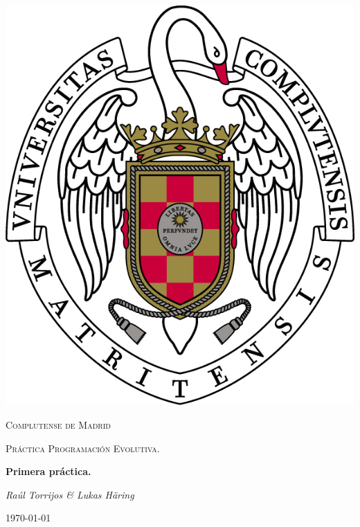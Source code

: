 \documentclass{article}
\begin{document}
\usetikzlibrary{automata,arrows, positioning}
\renewcommand{\contentsname}{Tabla de contenidos}

\begin{titlepage}
	\begin{center}
		\includegraphics{./images/escudo.jpg}
	\end{center}
	\centering
	{\scshape\LARGE Complutense de Madrid \par}
	\vspace{1cm}
	{\scshape\Large Práctica Programación Evolutiva.\par}
	\vspace{1.5cm}
	{\huge\bfseries Primera práctica. \par}
	\vspace{2cm}
	{\Large\itshape Raúl Torrijos \& Lukas Häring\par}
	\vfill
	\vfill

	{\large \today\par}
\end{titlepage}

\tableofcontents
\end{document}
